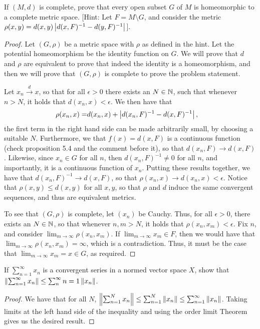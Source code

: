 \begin{exercise}{30}
If $(M,d)$ is complete, prove that every open subset $G$ of $M$ is homeomorphic to a complete metric space.
[Hint: Let $F = M\setminus G$, and consider the metric $\rho(x,y) = d(x,y) \left\lvert d(x,F)^{-1} - d(y,F)^{-1}\right\rvert$]. 
\end{exercise}
\begin{proof}
Let $(G, \rho)$ be a metric space with $\rho$ as defined in the hint.
Let the potential homeomorphism be the identity function on $G$.
We will prove that $d$ and $\rho$ are equivalent to prove that indeed the identity is a homeomorphism, and then we will prove that $(G,\rho)$ is complete to prove the problem statement.

Let $x_n \stackrel{d}{\to} x$, so that for all $\epsilon>0$ there exists an $N\in\mathbb{N}$, such that whenever $n>N$, it holds that $d(x_n, x) < \epsilon$.
We then have that 
\begin{align*}
    \rho(x_n, x)
    =& d(x_n, x) + \left\lvert d(x_n,F)^{-1} - d(x,F)^{-1}\right\rvert,
\end{align*}
the first term in the right hand side can be made arbitrarily small, by choosing a suitable $N$.
Furthermore, we that $f(x) = d(x,F)$ is a continuous function (check proposition 5.4 and the comment before it), so that $d(x_n, F) \to d(x,F)$.
Likewise, since $x_n \in G$ for all $n$, then $d(x_n, F)^{-1} \neq 0$ for all $n$, and importantly, it is a continuous function of $x_n$.
Putting these results together, we have that $d(x_n, F)^{-1} \to d(x,F)$, so that $\rho(x_n, x) \to d(x_n, x) < \epsilon$.
Notice that $\rho(x,y) \leq d(x,y)$ for all $x,y$, so that $\rho$ and $d$ induce the same convergent sequences, and thus are equivalent metrics.

To see that $(G, \rho)$ is complete, let $(x_n)$ be Cauchy.
Thus, for all $\epsilon >0$, there exists an $N\in\mathbb{N}$, so that whenever $n,m>N$, it holds that $\rho(x_n, x_m) < \epsilon$.
Fix $n$, and consider $\lim_{m\to \infty}\rho(x_n, x_m)$.
If $\lim_{m\to\infty} x_m \in F$, then we would have that $\lim_{m\to \infty} \rho(x_n, x_m) = \infty$, which is a contradiction.
Thus, it must be the case that $\lim_{m \to \infty} x_m = x \in G$, as required.
\end{proof} 

\begin{exercise}{31}
If $\sum^\infty_{n=1}x_n$ is a convergent series in a normed vector space $X$, show  that $\left\lVert \sum^\infty_{n=1}x_n\right\rVert\leq \sum^\infty_n{n=1}\left\lVert x_n\right\rVert$.
\end{exercise}
\begin{proof}
We have that for all $N$, $\left\lVert \sum^N_{n=1}x_n\right\rVert \leq \sum^N_{n=1} \left\lVert x_n\right\rVert \leq \sum^\infty_{n=1} \left\lVert x_n\right\rVert$.
Taking limits at the left hand side of the inequality and using the order limit Theorem gives us the desired result.
\end{proof} 

